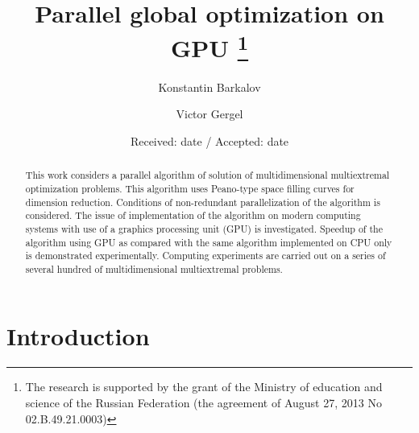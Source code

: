 \documentclass[smallcondensed]{svjour3}     %
\begin{document}
\title{Parallel global optimization on GPU 
	\thanks{The research is supported by the grant of the Ministry of education and science of the Russian Federation (the agreement of August 27, 2013 No 02.B.49.21.0003)}
}

\author{Konstantin Barkalov         \and
        Victor Gergel 
}



\date{Received: date / Accepted: date}


\maketitle

\begin{abstract}
This work considers a parallel algorithm of solution of multidimensional multiextremal optimization problems. This algorithm uses Peano-type space filling curves for dimension reduction. Conditions of non-redundant parallelization of the algorithm is considered. The issue of implementation of the algorithm on modern computing systems with use of a graphics processing unit (GPU) is investigated. Speedup of the algorithm using GPU as compared with the same algorithm implemented on CPU only is demonstrated experimentally. Computing experiments are carried out on a series of several hundred of multidimensional multiextremal problems.
\end{abstract}

\section{Introduction} \label{intro}
\end{document}
